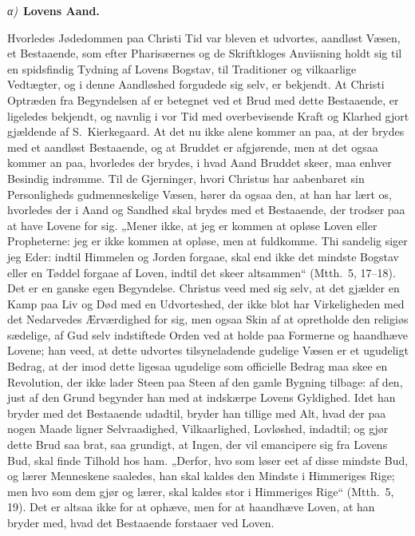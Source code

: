 \documentclass[12pt]{book}
\newcommand{\greekrun}[2]{%
  \medskip\begin{center}{\itshape #1)}\ {\bfseries #2}\end{center}\medskip}
\begin{document}
\greekrun{α}{Lovens Aand.}

Hvorledes Jødedommen paa Christi Tid var bleven et udvortes,
aandløst Væsen, et Bestaaende, som efter Pharisæernes og de
Skriftkloges Anviisning holdt sig til en spidsfindig Tydning af
Lovens Bogstav, til Traditioner og vilkaarlige Vedtægter, og i denne
Aandløshed forgudede sig selv, er bekjendt. At Christi Optræden fra
Begyndelsen af er betegnet ved et Brud med dette Bestaaende, er
ligeledes bekjendt, og navnlig i vor Tid med overbevisende Kraft og
Klarhed gjort gjældende af S.\ Kierkegaard. At det nu ikke alene
kommer an paa, at der brydes med et aandløst Bestaaende, og at
Bruddet er afgjørende, men at det ogsaa kommer an paa, hvorledes der
brydes, i hvad Aand Bruddet skeer, maa enhver Besindig indrømme. Til
de Gjerninger, hvori Christus har aabenbaret sin Personligheds
gudmenneskelige Væsen, hører da ogsaa den, at han har lært os,
hvorledes der i Aand og Sandhed skal brydes med et Bestaaende, der
trodser paa at have Lovene for sig. „Mener ikke, at jeg er kommen at
opløse Loven eller Propheterne: jeg er ikke kommen at opløse, men at
fuldkomme. Thi sandelig siger jeg Eder: indtil Himmelen og Jorden
forgaae, skal
end ikke det mindste Bogstav eller en Tøddel forgaae af Loven,
indtil det skeer altsammen“ (Mtth.\ 5, 17--18).
Det er en ganske
egen Begyndelse. Christus veed med sig selv, at det gjælder en Kamp
paa Liv og Død med en Udvorteshed, der ikke blot har Virkeligheden
med det Nedarvedes Ærværdighed for sig, men ogsaa Skin af at
opretholde den religiøs sædelige, af Gud selv indstiftede Orden ved
at holde paa Formerne og haandhæve Lovene; han veed, at dette
udvortes tilsyneladende gudelige Væsen er et ugudeligt Bedrag, at
der imod dette ligesaa ugudelige som officielle Bedrag maa skee en
Revolution, der ikke lader Steen paa Steen af den gamle Bygning
tilbage: af den, just af den Grund begynder han med at indskærpe
Lovens Gyldighed. Idet han bryder med det Bestaaende udadtil, bryder
han tillige med Alt, hvad der paa nogen Maade ligner Selvraadighed,
Vilkaarlighed, Lovløshed, indadtil; og gjør dette Brud saa brat, saa
grundigt, at Ingen, der vil emancipere sig fra Lovens Bud, skal
finde Tilhold hos ham. „Derfor, hvo som løser eet af disse mindste
Bud, og lærer Menneskene saaledes, han skal kaldes den Mindste i
Himmeriges Rige; men hvo som dem gjør og lærer, skal kaldes stor i
Himmeriges Rige“ (Mtth.\ 5, 19). Det er altsaa ikke for at ophæve,
men for at haandhæve Loven, at han bryder med, hvad det Bestaaende
forstaaer ved Loven.
\end{document}
